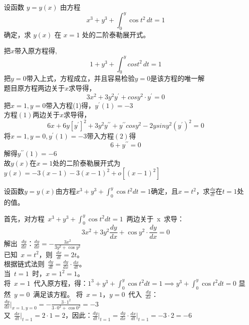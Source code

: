 \begin{question}
    设函数 $ y = y(x) $ 由方程
$$
x^3 + y^3 + \int_{0}^{y} \cos t^2 \, dt = 1
$$
确定，求 $ y(x) $ 在 $ x = 1 $ 处的二阶泰勒展开式。
\end{question}
\begin{solution}
    把\(x\)带入原方程得,\[1+y^3+\int_{0}^{y}cost^2\,dt = 1\]
    把\(y=0\)带入上式，方程成立，并且容易检验\(y=0\)是该方程的唯一解\\
    题目原方程两边关于\(x\)求导得，
    \begin{equation}
        3x^2 + 3 y^2 y^\prime + cosy^2 \cdot y^\prime = 0
    \end{equation}
    把\(x=1,y=0\)带入方程(1)得，\(y^\prime(1) = -3\)\\
    方程\((1)\)两边关于\(x\)求导得，
    \begin{equation}
        6x + 6 y [y^\prime]^2 + 3y^2y^{\prime\prime} + y^{\prime\prime}cosy^2 -2ysiny^2(y^\prime)^2 = 0
    \end{equation}
    将\(x =1,y=0,y^\prime(1) = -3\)带入方程\((2)\)得\[6+y^{\prime\prime} =0\]
    解得\(y^{\prime\prime}(1) = -6\)\\
    故\(y(x)\)在\(x=1\)处的二阶泰勒展开式为\(y(x) = -3(x-1) -3(x-1)^2 +o[(x-1)^2]\)
\end{solution}
\begin{question}
    设函数\(y = y(x)\)由方程\(x^{3} + y^{3} + \int_{0}^{y} \cos t^{2} dt = 1\)确定，且\(x = t^{2}\)，求\(\frac{dy}{dt}\)在\(t = 1\)处的值。
\end{question}
\begin{solution}
    首先，对方程 \(x^{3} + y^{3} + \int_{0}^{y} \cos t^{2} dt = 1\) 两边关于 x 求导：\[3x^{2} + 3y^{2} \frac{dy}{dx} + \cos y^{2} \cdot \frac{dy}{dx} = 0\]
    解出 \(\frac{dy}{dx}\)：\(\frac{dy}{dx} = -\frac{3x^{2}}{3y^{2} + \cos y^{2}}\)\\
    已知 \(x = t^{2}\)，则 \(\frac{dx}{dt} = 2t\)。\\
    根据链式法则 \(\frac{dy}{dt} = \frac{dy}{dx} \cdot \frac{dx}{dt}\)。\\
    当 \(t = 1\) 时，\(x = 1^{2} = 1\)。\\
    将 \(x = 1\) 代入原方程，得：\(1^{3} + y^{3} + \int_{0}^{y} \cos t^{2} dt = 1 \implies y^{3} + \int_{0}^{y} \cos t^{2} dt = 0\)
    显然 \(y = 0\) 满足该方程。
    将 \(x = 1\)，\(y = 0\) 代入 \(\frac{dy}{dx}\)：\(\frac{dy}{dx} \Big|_{x=1, y=0} = -\frac{3 \cdot 1^{2}}{3 \cdot 0^{2} + \cos 0^{2}} = -3\)\\
    又 \(\frac{dx}{dt} \big|_{t=1} = 2 \cdot 1 = 2\)，因此：\(\frac{dy}{dt} \Big|_{t=1} = \frac{dy}{dx} \cdot \frac{dx}{dt} \Big|_{t=1} = -3 \cdot 2 = \boxed{-6} \)
\end{solution}
